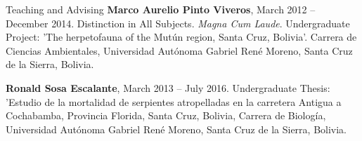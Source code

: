 \documentclass{resume} %
\begin{document}
\begin{rSection}{Teaching and Advising}
\textbf{Marco Aurelio Pinto Viveros}, March 2012 – December 2014. Distinction in All Subjects. {\em Magna Cum Laude}. Undergraduate Project: 'The herpetofauna of the Mutún region, Santa Cruz, Bolivia'. Carrera de Ciencias Ambientales, Universidad Autónoma Gabriel René Moreno, Santa Cruz de la Sierra, Bolivia.

\textbf{Ronald Sosa Escalante}, March 2013 – July 2016. Undergraduate Thesis: 'Estudio de la mortalidad de serpientes atropelladas en la carretera Antigua a Cochabamba, Provincia Florida, Santa Cruz, Bolivia, Carrera de Biología, Universidad Autónoma Gabriel René Moreno, Santa Cruz de la Sierra, Bolivia.

\end{rSection}


\end{document}
